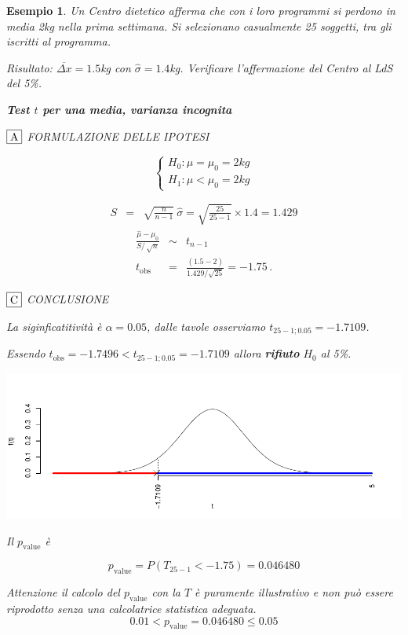 \documentclass[
  11pt,
]{book}
\theoremstyle{mytheoremstyle}
\theoremstyle{mydefstyle}
\newtheorem{example}{{Esempio}}[section]
\begin{document}
\begin{example}
Un Centro dietetico afferma che con i loro programmi si perdono in media
2kg nella prima settimana. Si selezionano casualmente 25 soggetti, tra
gli iscritti al programma.

Risultato: \(\overline{\Delta x}=1.5\)kg con \(\hat\sigma=1.4\)kg.
Verificare l'affermazione del Centro al LdS del 5\%.

\textbf{Test \(t\) per una media, varianza incognita}

\(\fbox{A}\) FORMULAZIONE DELLE IPOTESI

\[\begin{cases}
   H_0: \mu = \mu_0=2kg \\
   H_1: \mu < \mu_0=2kg 
   \end{cases}\]

\begin{eqnarray*}
   S    &=& \sqrt{\frac{n} {n-1}}\ \widehat{\sigma} 
   =  \sqrt{\frac{ 25 } { 25 -1}} \times  1.4  =  1.429 
   \end{eqnarray*}
\begin{eqnarray*}
   \frac{\hat\mu - \mu_{0}} {S/\,\sqrt{n}}&\sim&t_{n-1}\\
   t_{\text{obs}}
   &=& \frac{ ( 1.5 -  2 )} { 1.429 /\sqrt{ 25 }}
   =   -1.75 \, .
   \end{eqnarray*}

\(\fbox{C}\) CONCLUSIONE

La siginficatitività è \(\alpha=0.05\), dalle tavole osserviamo \(t_{25-1;0.05}=-1.7109\).

Essendo \(t_\text{obs}=-1.7496<t_{25-1;0.05}=-1.7109\) allora \textbf{rifiuto} \(H_0\) al 5\%.

\begin{center}\includegraphics{Appunti_di_Statistica_2025_files/figure-latex/15-test-mu-pi-6-1} \end{center}

Il \(p_{\text{value}}\) è

\[ p_{\text{value}} = P(T_{25-1}<-1.75)=0.046480 \]

Attenzione il calcolo del \(p_\text{value}\) con la \(T\) è puramente illustrativo e non può essere riprodotto senza una calcolatrice statistica adeguata.\[
 0.01 < p_\text{value}= 0.046480 \leq 0.05 
\]
\end{example}
\end{document}
